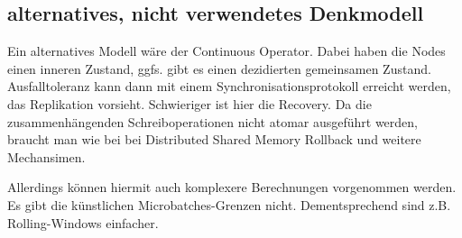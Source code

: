 \documentclass[letterpaper]{article}
\begin{document}
\subsection[alternatives, nicht verwendetes
Denkmodell]{\rmfamily alternatives, nicht
verwendetes Denkmodell}
Ein alternatives Modell wäre der Continuous Operator. Dabei haben die
Nodes einen inneren Zustand, ggfs. gibt es einen dezidierten
gemeinsamen Zustand. Ausfalltoleranz kann dann mit einem
Synchronisationsprotokoll erreicht werden, das Replikation vorsieht.
Schwieriger ist hier die Recovery. Da die zusammenhängenden
Schreiboperationen nicht atomar ausgeführt werden, braucht man wie bei
bei Distributed Shared Memory Rollback und weitere Mechansimen.

Allerdings können hiermit auch komplexere Berechnungen vorgenommen
werden. Es gibt die künstlichen Microbatches-Grenzen nicht.
Dementsprechend sind z.B. Rolling-Windows einfacher. 
\end{document}
